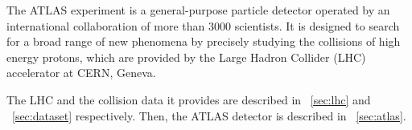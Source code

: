 
The ATLAS experiment is a general-purpose particle detector operated by an international 
collaboration of more than 3000 scientists. It is designed to search for a broad range of 
new phenomena by precisely studying the collisions of high energy protons, which are 
provided by the Large Hadron Collider (LHC) accelerator at CERN, Geneva.

The LHC and the \pp collision data it provides are described in \Section~\ref{sec:lhc}
and \Section~\ref{sec:dataset} respectively. Then, the ATLAS detector is described in
\Section~\ref{sec:atlas}.
